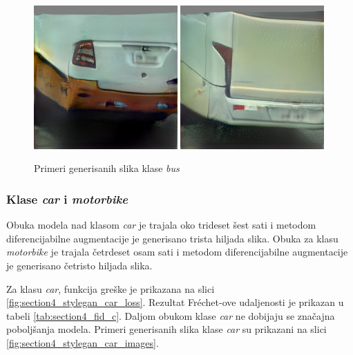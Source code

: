 \documentclass[12pt,oneside]{memoir}
\begin{document}
\begin{figure}[!htbp]
\centering
    \includegraphics[width=0.49\textwidth]{matfmaster/stylegan/bus/image0.png}  \includegraphics[width=0.49\textwidth]{matfmaster/stylegan/bus/image8.png} 
\caption{Primeri generisanih slika klase \textit{bus}}
\label{fig:section4_stylegan_bus_images}
\end{figure}

\subsubsection{Klase \textit{car} i \textit{motorbike}}

Obuka modela nad klasom \textit{car} je trajala oko trideset šest sati i metodom diferencijabilne augmentacije je generisano trista hiljada slika. Obuka za klasu \textit{motorbike} je trajala četrdeset osam sati i metodom diferencijabilne augmentacije je generisano četristo hiljada slika.

Za klasu \textit{car}, funkcija greške je prikazana na slici \ref{fig:section4_stylegan_car_loss}. Rezultat Fréchet-ove udaljenosti je prikazan u tabeli \ref{tab:section4_fid_c}. Daljom obukom klase \textit{car} ne dobijaju se značajna poboljšanja modela.
Primeri generisanih slika klase \textit{car} su prikazani na slici \ref{fig:section4_stylegan_car_images}.
\end{document}
